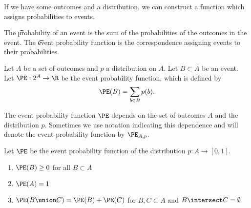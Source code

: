 

If we have some outcomes and a distribution, we can construct a function which assigns probabilities to events.


The \t{probability of an event} is the sum of the probabilities of the outcomes in the event.
The \t{event probability function} is the correspondence assigning events to their probabilities.


Let $A$ be a set of outcomes and $p$ a distribution on $A$.
Let $B \subset A$ be an event.
Let $\PE: 2^A \to \R$ be the event probability function, which is defined by
\[
  \PE(B) = \sum_{b \in B} p(b).
\]

The event probability function $\PE$ depends on the set of outcomes $A$ and the distribution $p$.
Sometimes we use notation indicating this dependence and will denote the event probability function by $\PE_{A, p}$.


\begin{prop}
Let $\PE$ be the event probability function
  of the distribution $p: A \to [0, 1]$.
\begin{enumerate}
\item $\PE(B) \geq 0$ for all $B \subset A$
\item $\PE(A) = 1$
\item
  $\PE(B \union C) = \PE(B) + \PE(C)$
  for $B, C \subset A$ and $B \intersect C = \emptyset$
\end{enumerate}
\end{prop}


